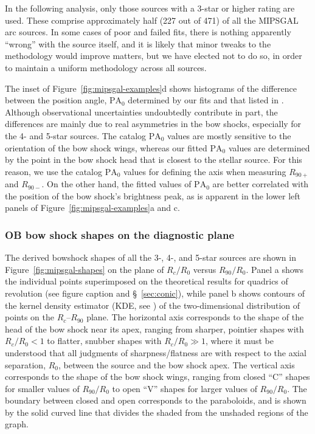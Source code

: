 In the following analysis, only those sources with a 3-star or higher
rating are used.  These comprise approximately half (227 out of 471)
of all the MIPSGAL arc sources.  In some cases of poor and failed
fits, there is nothing apparently ``wrong'' with the source itself,
and it is likely that minor tweaks to the methodology would improve
matters, but we have elected not to do so, in order to maintain a
uniform methodology across all sources.

The inset of Figure~\ref{fig:mipsgal-examples}d shows histograms of
the difference between the position angle, \(\text{PA}_0\) determined
by our fits and that listed in \citet{Kobulnicky:2016a}.  Although
observational uncertainties undoubtedly contribute in part, the
differences are mainly due to real asymmetries in the bow shocks,
especially for the 4- and 5-star sources.  The
\citeauthor{Kobulnicky:2016a} catalog \(\text{PA}_0\) values are
mostly sensitive to the orientation of the bow shock wings, whereas
our fitted \(\text{PA}_0\) values are determined by the point in the
bow shock head that is closest to the stellar source.  For this
reason, we use the catalog \(\text{PA}_0\) values for defining the
axis when measuring \(R_{90+}\) and \(R_{90-}\). On the other hand,
the fitted values of \(\text{PA}_0\) are better correlated with the
position of the bow shock's brightness peak, as is apparent in the
lower left panels of Figure~\ref{fig:mipsgal-examples}a and c.

\subsubsection{OB bow shock shapes on the diagnostic plane}
\label{sec:ob-shapes}

The derived bowshock shapes of all the 3-, 4-, and 5-star sources are
shown in Figure~\ref{fig:mipsgal-shapes} on the plane of \(R_c/R_0\)
versus \(R_{90} / R_0\).  Panel a shows the individual points
superimposed on the theoretical results for quadrics of revolution
(see figure caption and \S~\ref{sec:conic}), while panel b shows
contours of the kernel density estimator (KDE, see
\citealp{Leiva-Murillo:2012a, Scott:2015a}) of the two-dimensional
distribution of points on the \(R_c\)--\(R_{90}\) plane.  The
horizontal axis corresponds to the shape of the head of the bow shock
near its apex, ranging from sharper, pointier shapes with
\(R_c/R_0 < 1\) to flatter, snubber shapes with \(R_c/R_0 \gg 1\), where
it must be understood that all judgments of sharpness/flatness are
with respect to the axial separation, \(R_0\), between the source and
the bow shock apex.  The vertical axis corresponds to the shape of the
bow shock wings, ranging from closed ``C'' shapes for smaller values
of \(R_{90} / R_0\) to open ``V'' shapes for larger values of
\(R_{90} / R_0\).  The boundary between closed and open corresponds to
the paraboloids, and is shown by the solid curved line that divides
the shaded from the unshaded regions of the graph.

